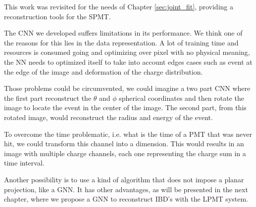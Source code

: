\documentclass[../main.tex]{subfiles}
\begin{document}
This work was revisited for the needs of Chapter \ref{sec:joint_fit}, providing a reconstruction tools for the SPMT.

The CNN we developed suffers limitations in its performance. We think one of the  reasons for this lies in  the data representation. A lot of training time and resources is consumed going and optimizing over pixel with no physical meaning, the NN needs to optimized itself to take into account edges cases such as event at the edge of the image and deformation of the charge distribution.

Those problems could be circumvented, we could imagine a two part CNN where the first part reconstruct the $\theta$ and $\phi$ spherical coordinates and then rotate the image to locate the event in the center of the image. The second part, from this rotated image, would reconstruct the radius and energy of the event.

To overcome the time problematic, i.e. what is the time of a PMT that was never hit, we could transform this channel into a dimension. This would results in an image with multiple charge channels, each one representing the charge sum in a time interval.

Another possibility is to use  a kind of algorithm that does not impose a planar projection, like a GNN. It has other advantages, as will be presented in the next chapter, where we propose a GNN to reconstruct IBD's with the LPMT system. 
\end{document}
